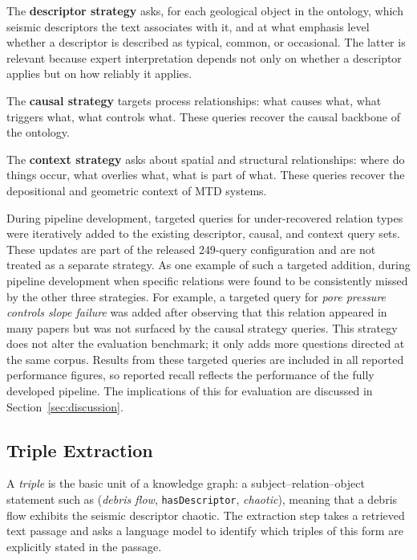 \documentclass[10pt]{article}
\newcommand{\pred}[1]{\texttt{\small #1}}
\begin{document}
The \textbf{descriptor strategy} asks, for each geological
object in the ontology, which seismic descriptors the text
associates with it, and at what emphasis level  whether a
descriptor is described as typical, common, or occasional.
The latter is relevant because expert interpretation depends
not only on whether a descriptor applies but on how reliably
it applies.

The \textbf{causal strategy} targets process relationships:
what causes what, what triggers what, what controls what.
These queries recover the causal backbone of the ontology.

The \textbf{context strategy} asks about spatial and
structural relationships: where do things occur, what
overlies what, what is part of what.
These queries recover the depositional and geometric context
of MTD systems.

During pipeline development, targeted queries for under-recovered relation types were iteratively added to the existing descriptor, causal, and context query sets. These updates are part of the released 249-query configuration and are not treated as a separate strategy. As one example of such a targeted addition,
during pipeline development when specific relations were
found to be consistently missed by the other three
strategies.
For example, a targeted query for \emph{pore pressure
controls slope failure} was added after observing that this
relation appeared in many papers but was not surfaced by the
causal strategy queries.
This strategy does not alter the evaluation benchmark; it
only adds more questions directed at the same corpus.
Results from these targeted queries are included in all reported
performance figures, so reported recall reflects the
performance of the fully developed pipeline.
The implications of this for evaluation are discussed in
Section~\ref{sec:discussion}.

\subsection{Triple Extraction}
\label{sec:extraction}

A \emph{triple} is the basic unit of a knowledge graph: a
subject--relation--object statement such as (\emph{debris
flow}, \pred{hasDescriptor}, \emph{chaotic}), meaning that
a debris flow exhibits the seismic descriptor chaotic.
The extraction step takes a retrieved text passage and asks
a language model to identify which triples of this form are
explicitly stated in the passage.
\end{document}
